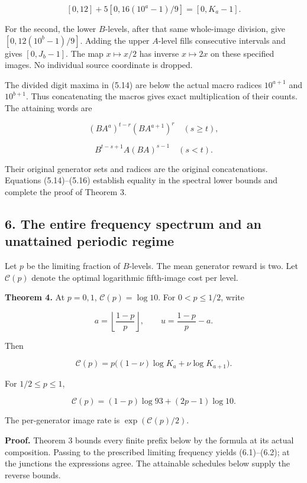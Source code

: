 \[
[0,12]+5[0,16(10^a-1)/9]
=[0,K_a-1].
\]

For the second, the lower \(B\)-levels, after that same whole-image division, give \([0,12(10^b-1)/9]\). Adding the upper \(A\)-level fills consecutive intervals and gives \([0,J_b-1]\). The map \(x\mapsto x/2\) has inverse \(x\mapsto2x\) on these specified images. No individual source coordinate is dropped.

The divided digit maxima in (5.14) are below the actual macro radices \(10^{a+1}\) and \(10^{b+1}\). Thus concatenating the macros gives exact multiplication of their counts. The attaining words are

\[
(BA^a)^{t-r}(BA^{a+1})^r\quad(s\ge t),
\tag{5.15}
\]

\[
B^{t-s+1}A(BA)^{s-1}\quad(s<t).
\tag{5.16}
\]

Their original generator sets and radices are the original concatenations. Equations (5.14)--(5.16) establish equality in the spectral lower bounds and complete the proof of Theorem 3.

\subsection{6. The entire frequency spectrum and an unattained periodic regime}\label{eporig:the-entire-frequency-spectrum-and-an-unattained-periodic-regime}

Let \(p\) be the limiting fraction of \(B\)-levels. The mean generator reward is two. Let \(\mathcal C(p)\) denote the optimal logarithmic fifth-image cost per level.

\textbf{Theorem 4.} At \(p=0,1\), \(\mathcal C(p)=\log10\). For \(0<p\le1/2\), write

\[
a=\left\lfloor\frac{1-p}{p}\right\rfloor,\qquad
u=\frac{1-p}{p}-a.
\]

Then

\[
\boxed{\mathcal C(p)=p\bigl((1-\nu)\log K_a+\nu\log K_{a+1}\bigr).}
\tag{6.1}
\]

For \(1/2\le p\le1\),

\[
\boxed{\mathcal C(p)=(1-p)\log93+(2p-1)\log10.}
\tag{6.2}
\]

The per-generator image rate is \(\exp(\mathcal C(p)/2)\).

\textbf{Proof.} Theorem 3 bounds every finite prefix below by the formula at its actual composition. Passing to the prescribed limiting frequency yields (6.1)--(6.2); at the junctions the expressions agree. The attainable schedules below supply the reverse bounds.

